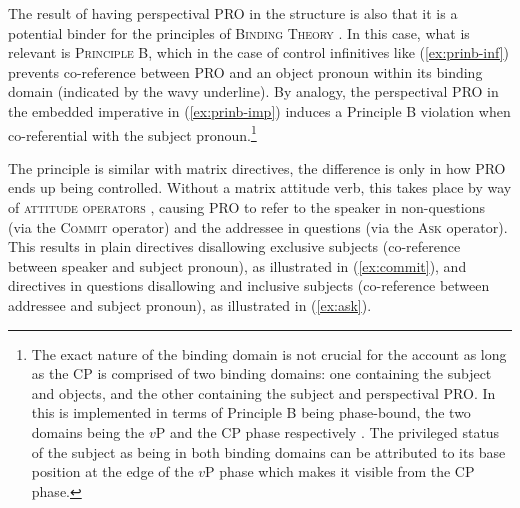 \documentclass[output=paper,colorlinks,citecolor=brown]{langscibook}
\begin{document}
The result of having perspectival PRO in the structure is also that it is a potential binder for the principles of \textsc{Binding Theory} \citep{chomsky81}. In this case, what is relevant is \textsc{Principle B}, which in the case of control infinitives like (\ref{ex:prinb-inf}) prevents co-reference between PRO and an object pronoun within its binding domain (indicated by the wavy underline). By analogy, the perspectival PRO in the embedded imperative in (\ref{ex:prinb-imp}) induces a Principle B violation when co-referential with the subject pronoun.\footnote{The exact nature of the binding domain is not crucial for the account as long as the CP is comprised of two binding domains: one containing the subject and objects, and the other containing the subject and perspectival PRO. In \textcite{stegovec19} this is implemented in terms of Principle B being phase-bound, the two domains being the $v$P and the CP phase respectively \citep{chomsky00}. The privileged status of the subject as being in both binding domains can be attributed to its base position at the edge of the $v$P phase which makes it visible from the CP phase.}

\ea \label{ex:prinb}
\z\z 

\noindent The principle is similar with matrix directives, the difference is only in how PRO ends up being controlled. Without a matrix attitude verb, this takes place by way of \textsc{attitude operators} \citep[see e.g.][]{pearson12}, causing PRO to refer to the speaker in non-questions (via the \textsc{Commit} operator) and the addressee in questions (via the \textsc{Ask} operator). This results in plain directives disallowing exclusive \fst{} subjects (co-reference between speaker and subject pronoun), as illustrated in (\ref{ex:commit}), and directives in questions disallowing \snd{} and inclusive \fst{} subjects (co-reference between addressee and subject pronoun), as illustrated in (\ref{ex:ask}).

\ea \label{ex:commit}
\z\z
\ea \label{ex:ask}\ea[]{[ \textsc{Ask}(addressee$_k$) [ PRO$_k$ \textsc{dir} [ \emph{pro}$_i$ leave.\textsc{1} ]] \hfill (\textit{Naj grem?})}
\ex[*]{[ \textsc{Ask}(addressee$_k$) [ PRO$_k$ \textsc{dir} [ \emph{pro}$_k$ leave.\textsc{imp.2} ]] \hfill (\textit{*Pojdi?})}
\z\z 
\end{document}
